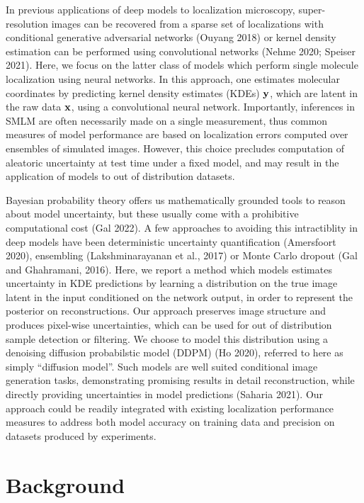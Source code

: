 \documentclass{article}
\begin{document}
In previous applications of deep models to localization microscopy, super-resolution images can be recovered from a sparse set of localizations with conditional generative adversarial networks (Ouyang 2018) or kernel density estimation can be performed using convolutional networks (Nehme 2020; Speiser 2021). Here, we focus on the latter class of models which perform single molecule localization using neural networks. In this approach, one estimates molecular coordinates by predicting kernel density estimates (KDEs) $\bold{y}$, which are latent in the raw data $\bold{x}$, using a convolutional neural network. Importantly, inferences in SMLM are often necessarily made on a single measurement, thus common measures of model performance are based on localization errors computed over ensembles of simulated images. However, this choice precludes computation of aleatoric uncertainty at test time under a fixed model, and may result in the application of models to out of distribution datasets.

Bayesian probability theory offers us mathematically grounded tools to reason about model uncertainty, but these usually come with a prohibitive computational cost (Gal 2022). A few approaches to avoiding this intractiblity in deep models have been deterministic uncertainty quantification (Amersfoort 2020), ensembling (Lakshminarayanan et al., 2017) or Monte Carlo dropout (Gal and Ghahramani, 2016). Here, we report a method which models estimates uncertainty in KDE predictions by learning a distribution on the true image latent in the input conditioned on the network output, in order to represent the posterior on reconstructions. Our approach preserves image structure and produces pixel-wise uncertainties, which can be used for out of distribution sample detection or filtering. We choose to model this distribution using a denoising diffusion probabilstic model (DDPM) (Ho 2020), referred to here as simply ``diffusion model''. Such models are well suited conditional image generation tasks, demonstrating promising results in detail reconstruction, while directly providing uncertainties in model predictions (Saharia 2021). Our approach could be readily integrated with existing localization performance measures to address both model accuracy on training data and precision on datasets produced by experiments. 

\section{Background}
\end{document}
